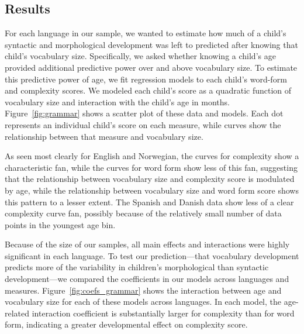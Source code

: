 \documentclass[10pt,letterpaper]{article}
\begin{document}
\subsection{Results}

For each language in our sample, we wanted to estimate how much of a child's syntactic and morphological development was left to predicted after knowing that child's vocabulary size. Specifically, we asked whether knowing a child's age provided additional predictive power over and above vocabulary size. To estimate this predictive power of age, we fit regression models to each child's word-form and complexity scores. We modeled each child's score as a quadratic function of vocabulary size and interaction with the child's age in months. Figure~\ref{fig:grammar} shows a scatter plot of these data and models. Each dot represents an individual child's score on each measure, while curves show the relationship between that measure and vocabulary size. 

As seen most clearly for English and Norwegian, the curves for complexity show a characteristic fan, while the curves for word form show less of this fan, suggesting that the relationship between vocabulary size and complexity score is modulated by age, while the relationship between vocabulary size and word form score shows this pattern to a lesser extent. The Spanish and Danish data show less of a clear complexity curve fan, possibly because of the relatively small number of data points in the youngest age bin.

Because of the size of our samples, all main effects and interactions were highly significant in each language. To test our prediction---that vocabulary development predicts more of the variability in children's morphological than syntactic development---we compared the coefficients in our models across languages and measures. Figure~\ref{fig:coefs_grammar} shows the interaction between age and vocabulary size for each of these models across languages. In each model, the age-related interaction coefficient is substantially larger for complexity than for word form, indicating a greater developmental effect on complexity score. 
\end{document}
